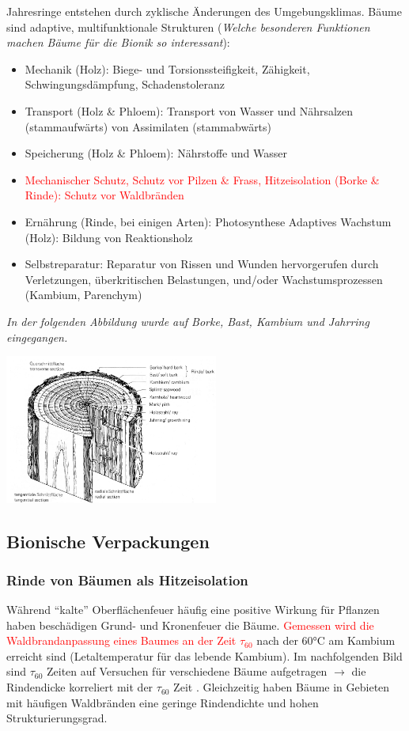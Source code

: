 Jahresringe entstehen durch zyklische Änderungen des Umgebungsklimas. Bäume sind adaptive, multifunktionale Strukturen (\dangersign \textit{Welche besonderen Funktionen machen Bäume für
die Bionik so interessant}):
\begin{itemize}
    \item Mechanik (Holz): Biege- und Torsionssteifigkeit, Zähigkeit, Schwingungsdämpfung, Schadenstoleranz
    \item Transport (Holz \& Phloem): Transport von Wasser und Nährsalzen (stammaufwärts) von Assimilaten (stammabwärts)
    \item Speicherung (Holz \& Phloem): Nährstoffe und Wasser
    \item \textcolor{red}{Mechanischer Schutz, Schutz vor Pilzen \& Frass, Hitzeisolation (Borke \& Rinde): Schutz vor Waldbränden}
    \item Ernährung (Rinde, bei einigen Arten): Photosynthese Adaptives Wachstum (Holz): Bildung von Reaktionsholz
    \item Selbstreparatur: Reparatur von Rissen und Wunden hervorgerufen durch Verletzungen, überkritischen Belastungen, und/oder Wachstumsprozessen (Kambium, Parenchym)
\end{itemize}
\textit{In der folgenden Abbildung wurde auf Borke, Bast, Kambium und Jahrring eingegangen.}
\begin{center}
    \includegraphics[width=7cm]{lec6/figures/holz.png}
\end{center}

\subsection{Bionische Verpackungen}

\subsubsection{Rinde von Bäumen als Hitzeisolation}

Während ``kalte'' Oberflächenfeuer häufig eine positive Wirkung für Pflanzen haben beschädigen Grund- und Kronenfeuer die Bäume. \textcolor{red}{Gemessen wird die Waldbrandanpassung eines Baumes an der Zeit $\tau_{60}$} nach der 60°C am Kambium erreicht sind \dangersign (Letaltemperatur für das lebende Kambium). Im nachfolgenden Bild sind $\tau_{60}$ Zeiten auf Versuchen für verschiedene Bäume aufgetragen $\rightarrow$ die Rindendicke korreliert mit der $\tau_{60}$ Zeit \dangersign. Gleichzeitig haben Bäume in Gebieten mit häufigen Waldbränden eine geringe Rindendichte und hohen Strukturierungsgrad.

